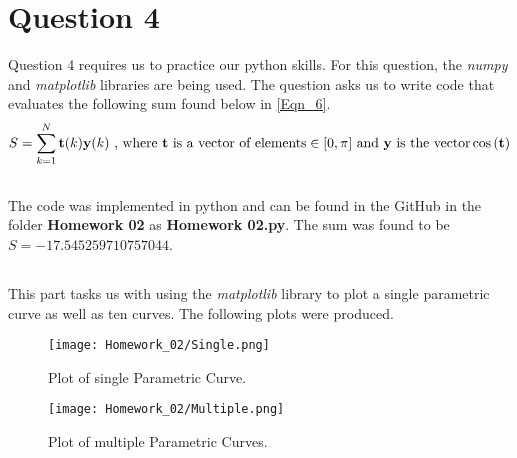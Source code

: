 \documentclass{article}
\begin{document}
\section{Question 4}
Question 4 requires us to practice our python skills. For this question, the \textit{numpy} and \textit{matplotlib} libraries are being used. The question asks us to write code that evaluates the following sum found below in \ref{Eqn_6}.
\begin{equation}
    \label{Eqn_6}
    S = \sum_{k=1}^{N}\textbf{t}(k)\textbf{y}(k) \mbox{ , where \textbf{t} is a vector of elements} \in [0, \pi] \mbox{ and \textbf{y} is the vector} \cos{(\textbf{t})}
\end{equation}

\subsection{}
The code was implemented in python and can be found in the GitHub in the folder \textbf{Homework 02} as \textbf{Homework 02.py}. The sum was found to be \(S=-17.545259710757044\).

\subsection{}
This part tasks us with using the \textit{matplotlib} library to plot a single parametric curve as well as ten curves. The following plots were produced.
\begin{figure}[h!]
    \centering
    \texttt{[image: Homework\_02/Single.png]}
    \caption{Plot of single Parametric Curve.}
    \label{fig:Single}
\end{figure}
\begin{figure}[h!]
    \centering
    \texttt{[image: Homework\_02/Multiple.png]}
    \caption{Plot of multiple Parametric Curves.}
    \label{fig:Multiple}
\end{figure}
\end{document}
